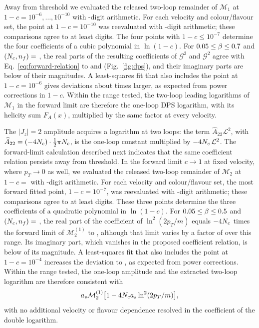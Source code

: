 Away from threshold we evaluated the released two-loop remainder of $\mathcal M_1$ at $1-c=10^{-6},\ldots,10^{-10}$ with \MoneFwdDigits-digit arithmetic. For each velocity and colour/flavour set, the point at $1-c=10^{-10}$ was reevaluated with \MoneFwdCheckDigits-digit arithmetic; these comparisons agree to at least \MoneFwdCheckAgreement{} digits. The four points with $1-c\leq10^{-7}$ determine the four coefficients of a cubic polynomial in $\ln(1-c)$. For $0.05\leq\beta\leq0.7$ and $(N_c,n_f)=$ \MoneFwdSets, the real parts of the resulting coefficients of $\mathcal G^3$ and $\mathcal G^2$ agree with Eq.~\eqref{eq:forward-relation} to \MoneFwdDevThree{} and \MoneFwdDevTwo{} (Fig.~\ref{fig:dps}), and their imaginary parts are below \MoneFwdImag{} of their magnitudes. A least-squares fit that also includes the point at $1-c=10^{-6}$ gives deviations about \MoneFwdWindowFactor{} times larger, as expected from power corrections in $1-c$. Within the range tested, the two-loop leading logarithms of $\mathcal M_1$ in the forward limit are therefore the one-loop DPS logarithm, with its helicity sum $F_A(x)$, multiplied by the same factor at every velocity.

The $|J_z|=2$ amplitude acquires a logarithm at two loops: the term
$\widehat A_{22}\mathcal L^2$, with
$\widehat A_{22}=(- 4 N_c)\cdot\tfrac{1}{2}\pi N_c$, is the one-loop
constant multiplied by $- 4 N_c\,\mathcal L^2$. The forward-limit calculation described next indicates that the same coefficient relation persists away from threshold. In the forward limit $c\to1$ at fixed velocity, where $p_T\to0$ as well, we evaluated the released two-loop remainder of $\mathcal M_2$ at $1-c=$ \JzExponents{} with \JzDigits-digit arithmetic. For each velocity and colour/flavour set, the most forward fitted point, $1-c=10^{-7}$, was reevaluated with \JzCheckDigits-digit arithmetic; these comparisons agree to at least \JzCheckAgreement{} digits. These three points determine the three coefficients of a quadratic polynomial in $\ln(1-c)$. For $0.05\leq\beta\leq0.5$ and $(N_c,n_f)=$ \JzSets, the real part of the coefficient of $\ln^2(2p_T/m)$ equals $-4N_c$ times the forward limit of $\mathcal M_2^{(1)}$ to \JzMaxDev, although that limit varies by a factor of \JzKOneRatio{} over this range. Its imaginary part, which vanishes in the proposed coefficient relation, is below \JzImag{} of its magnitude. A least-squares fit that also includes the point at $1-c=10^{-4}$ increases the deviation to \JzMaxDevWide, as expected from power corrections. Within the range tested, the one-loop amplitude and the extracted two-loop logarithm are therefore consistent with
\begin{equation}
 a_s\mathcal M_2^{(1)}\bigl[1-4N_ca_s\ln^2(2p_T/m)\bigr],
 \label{eq:jz2-forward}
\end{equation}
with no additional velocity or flavour dependence resolved in the coefficient of the double logarithm.

